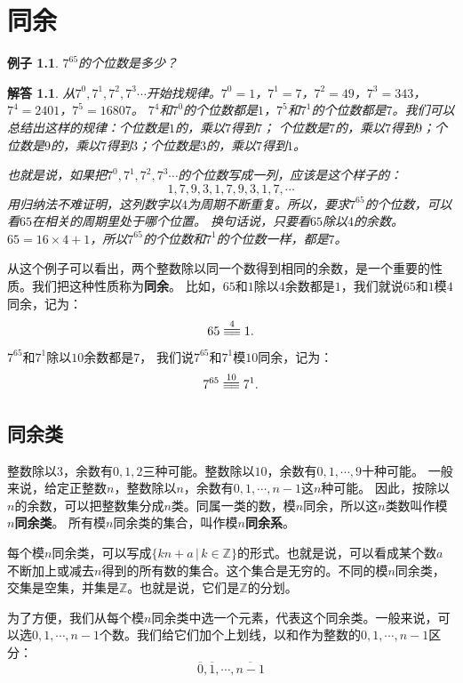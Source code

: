 \documentclass[12pt,UTF8]{ctexbook}
\newtheorem{ex}{例子}[section]
\newtheorem*{so}{解答}
\newcommand{\tong}[1]{\overset{#1}{\equiv\joinrel\equiv}}
\begin{document}
\chapter{同余}
\begin{ex}\label{ex:3-0-0}
    $7^{65}$的个位数是多少？
\end{ex}
\begin{so}
    从$7^0,7^1,7^2,7^3\cdots$开始找规律。$7^0=1$，$7^1=7$，$7^2=49$，$7^3=343$，$7^4=2401$，$7^5=16807$。
    $7^4$和$7^0$的个位数都是$1$，$7^5$和$7^1$的个位数都是$7$。我们可以总结出这样的规律：个位数是$1$的，乘以$7$得到$7$；
    个位数是$7$的，乘以$7$得到$9$；个位数是$9$的，乘以$7$得到$3$；个位数是$3$的，乘以$7$得到$1$。

    也就是说，如果把$7^0,7^1,7^2,7^3\cdots$的个位数写成一列，应该是这个样子的：
    $$ 1, 7, 9, 3, 1, 7, 9, 3, 1, 7, \cdots$$
    用归纳法不难证明，这列数字以$4$为周期不断重复。所以，要求$7^{65}$的个位数，可以看$65$在相关的周期里处于哪个位置。
    换句话说，只要看$65$除以$4$的余数。$65 = 16 \times 4 + 1$，所以$7^{65}$的个位数和$7^1$的个位数一样，都是$7$。
\end{so}

从这个例子可以看出，两个整数除以同一个数得到相同的余数，是一个重要的性质。我们把这种性质称为\textbf{同余}。
比如，$65$和$1$除以$4$余数都是$1$，我们就说$65$和$1$模$4$同余，记为：
$$ 65 \tong{4} 1. $$
$7^{65}$和$7^1$除以$10$余数都是$7$，
我们说$7^{65}$和$7^1$模$10$同余，记为：
$$ 7^{65} \tong{10} 7^1. $$  %

\section{同余类}
整数除以$3$，余数有$0,1,2$三种可能。整数除以$10$，余数有$0,1,\cdots , 9$十种可能。
一般来说，给定正整数$n$，整数除以$n$，余数有$0,1,\cdots , n-1$这$n$种可能。
因此，按除以$n$的余数，可以把整数集分成$n$类。同属一类的数，模$n$同余，所以这$n$类数叫作模$n$\textbf{同余类}。
所有模$n$同余类的集合，叫作模$n$\textbf{同余系}。

每个模$n$同余类，可以写成$\{kn + a \, | \, k\in\mathbb{Z} \}$的形式。也就是说，可以看成某个数$a$不断加上或减去$n$得到的所有数的集合。这个集合是无穷的。不同的模$n$同余类，交集是空集，并集是$\mathbb{Z}$。也就是说，它们是$\mathbb{Z}$的分划。

为了方便，我们从每个模$n$同余类中选一个元素，代表这个同余类。一般来说，可以选$0,1,\cdots,n-1$个数。我们给它们加个上划线，以和作为整数的$0,1,\cdots,n-1$区分：
$$\overline{0},\overline{1},\cdots,\overline{n-1}$$
\end{document}
